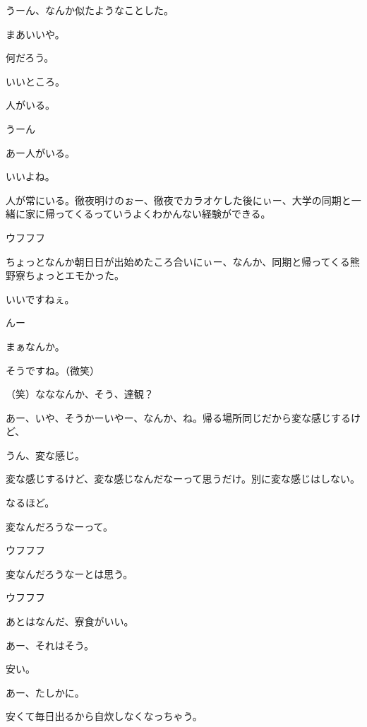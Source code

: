\begin{multicols}{3}
{        うーん、なんか似たようなことした。

        まあいいや。

        何だろう。

        いいところ。

        人がいる。

        うーん

        あー人がいる。

        いいよね。

        人が常にいる。徹夜明けのぉー、徹夜でカラオケした後にぃー、大学の同期と一緒に家に帰ってくるっていうよくわかんない経験ができる。

        ウフフフ

        ちょっとなんか朝日日が出始めたころ合いにぃー、なんか、同期と帰ってくる熊野寮ちょっとエモかった。

        いいですねぇ。

        んー

        まぁなんか。

        そうですね。（微笑）

        （笑）なななんか、そう、達観？

        あー、いや、そうかーいやー、なんか、ね。帰る場所同じだから変な感じするけど、

        うん、変な感じ。

        変な感じするけど、変な感じなんだなーって思うだけ。別に変な感じはしない。

        なるほど。

        変なんだろうなーって。

        ウフフフ

        変なんだろうなーとは思う。

        ウフフフ

        あとはなんだ、寮食がいい。

        あー、それはそう。

        安い。

        あー、たしかに。

        安くて毎日出るから自炊しなくなっちゃう。

}
\end{multicols}
